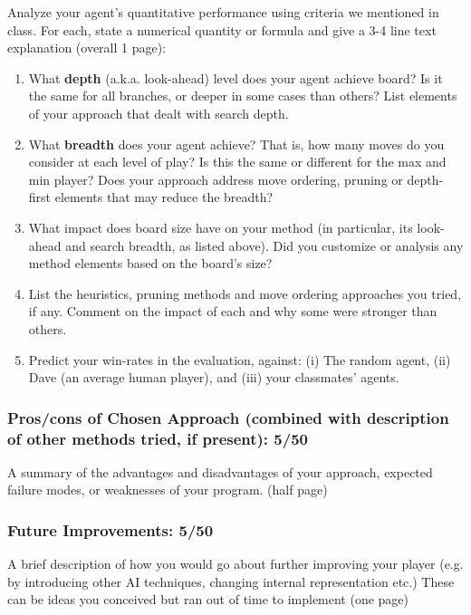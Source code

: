 \documentclass[12pt, letterpaper]{article}
\begin{document}
        Analyze your agent's quantitative performance using  criteria we mentioned in class. For each, state a numerical quantity or formula and give a 3-4 line text explanation (overall 1 page):
        \begin{enumerate}
            \item What \textbf{depth} (a.k.a. look-ahead) level does your agent achieve  board? Is it the same for all branches, or deeper in some cases than others? List elements of your approach that dealt with search depth.
            \item What \textbf{breadth} does your agent achieve? That is, how many moves do you consider at each level of play? Is this the same or different for the max and min player? Does your approach address move ordering, pruning or  depth-first elements that may reduce the breadth?
            \item What impact does board size have on your method (in particular, its look-ahead and search breadth, as listed above). Did you customize or analysis any method elements based on the board's size?
            \item List the heuristics, pruning methods and move ordering approaches you tried, if any. Comment on the impact of each and why some were stronger than others.
            \item Predict your win-rates in the evaluation, against: (i) The random agent, (ii) Dave (an average human player), and (iii) your classmates' agents.
        \end{enumerate}
    
\subsubsection*{Pros/cons of Chosen Approach (combined with description of other methods tried, if present): 5/50}
    
    A summary of the advantages and disadvantages of your approach, expected failure modes, or weaknesses of your program. (half page)
    
\subsubsection*{Future Improvements: 5/50}

    A brief description of how you would go about further improving your player (e.g. by introducing other AI techniques, changing internal representation etc.) These can be ideas you conceived but ran out of time to implement (one page)






\pagebreak
\end{document}
